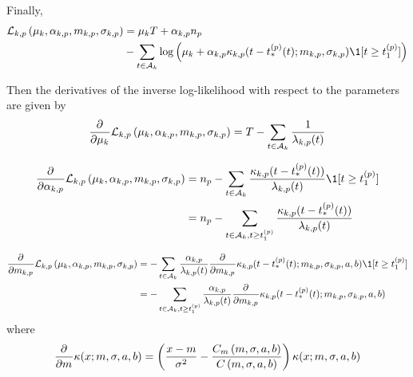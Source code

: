 Finally,
\begin{equation}
\begin{split}
    \mathcal{L}_{k,p}\pars{\mu_k, \alpha_{k,p}, m_{k,p}, \sigma_{k,p}} &= \mu_k T + \alpha_{k,p}n_p \\
    &- \sum_{t\in\mathcal{A}_k} \log \pars{\mu_k + \alpha_{k,p}\kappa_{k,p}(t - t_*^{(p)}(t); m_{k,p}, \sigma_{k,p})\1[t \geq t_1^{(p)}]}
\end{split}
\end{equation}


Then the derivatives of the inverse log-likelihood with respect to the parameters are given by
\begin{equation}
    \frac{\partial^{}}{\partial {\mu_k}^{}}\mathcal{L}_{k,p}\left( \mu_k, \alpha_{k,p}, m_{k,p}, \sigma_{k,p} \right) = T - \sum_{t\in\mathcal{A}_k}\frac{1}{\lambda_{k,p}(t)}
\end{equation}

\begin{equation}
\begin{split}
    \partiald{}{\alpha_{k,p}}\mathcal{L}_{k,p}\pars{\mu_k, \alpha_{k,p}, m_{k,p}, \sigma_{k,p}} &= n_p - \sum_{t\in\mathcal{A}_k}\frac{\kappa_{k,p}(t - t_*^{(p)}(t))}{\lambda_{k,p}(t)}\1[t \geq t_1^{(p)}] \\
    &= n_p - \sum_{t\in\mathcal{A}_k, t \geq t_1^{(p)}}\frac{\kappa_{k,p}(t - t_*^{(p)}(t))}{\lambda_{k,p}(t)}
\end{split}
\end{equation}

\begin{equation}
\begin{split}
    \partiald{}{m_{k,p}}\mathcal{L}_{k,p}\pars{\mu_k, \alpha_{k,p}, m_{k,p}, \sigma_{k,p}} &= -\sum_{t\in\mathcal{A}_k}\frac{\alpha_{k,p}}{\lambda_{k,p}(t)}\partiald{}{m_{k,p}}\kappa_{k,p}(t - t_*^{(p)}(t); m_{k,p}, \sigma_{k,p}, a, b)\1[t \geq t_1^{(p)}] \\
    &= -\sum_{t\in\mathcal{A}_k, t \geq t_1^{(p)}}\frac{\alpha_{k,p}}{\lambda_{k,p}(t)}\partiald{}{m_{k,p}}\kappa_{k,p}(t - t_*^{(p)}(t); m_{k,p}, \sigma_{k,p}, a, b)
\end{split}
\end{equation}
where
\begin{equation}
    \frac{\partial^{}}{\partial {m}^{}}\kappa(x ; m, \sigma, a, b) = \left( \frac{x-m}{\sigma^2} - \frac{C_m\left( m, \sigma,a,b \right)}{C\left( m, \sigma,a,b \right)} \right)\kappa(x ; m, \sigma, a, b)
\end{equation}


